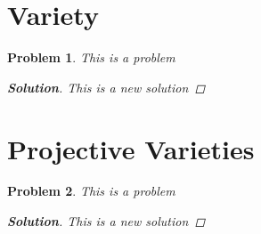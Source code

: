 \documentclass[11pt]{article}
\newtheorem{problem}{Problem}
\numberwithin{problem}{section}
\newenvironment{solution}
               {\let\oldqedsymbol=\qedsymbol
                \renewcommand{\qedsymbol}{$\blacktriangleleft$}
                \begin{proof}[\bfseries\upshape Solution]}
               {\end{proof}
                \renewcommand{\qedsymbol}{\oldqedsymbol}}
\begin{document}
\section{Variety}

\begin{problem}
This is a problem
\begin{solution}
This is a new solution	
\end{solution}	
\end{problem}



\section{Projective Varieties}

\begin{problem}
This is a problem
\begin{solution}
This is a new solution	
\end{solution}	
\end{problem}
\end{document}
